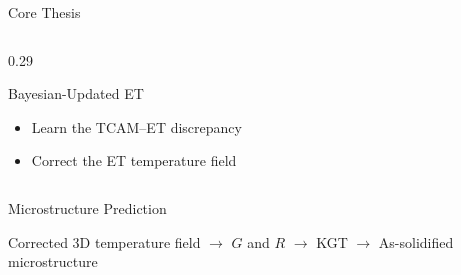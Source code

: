 \documentclass[aspectratio=169,11pt]{beamer}
\begin{document}
\begin{frame}[t]{Core Thesis}
\begin{columns}[c,onlytextwidth]
\begin{column}{0.29\textwidth}
\begin{alertblock}{\centering Bayesian-Updated ET}
\begin{minipage}[t][0.43\textheight][t]{\linewidth}
        \vspace{0.35em}
        \begin{itemize}
          \setlength{\itemsep}{0.55em}
          \item Learn the TCAM--ET discrepancy
          \item Correct the ET temperature field
        \end{itemize}
        \end{minipage}
      \end{alertblock}
    \end{column}
  \end{columns}

  \vspace{0.65em}
  \begin{block}{Microstructure Prediction}
    {\fontsize{21}{25}\selectfont\centering
    Corrected 3D temperature field
    \quad$\longrightarrow$\quad
    $G$ and $R$
    \quad$\longrightarrow$\quad
    KGT
    \quad$\longrightarrow$\quad
    As-solidified microstructure\par}
  \end{block}
\end{frame}
\end{document}

